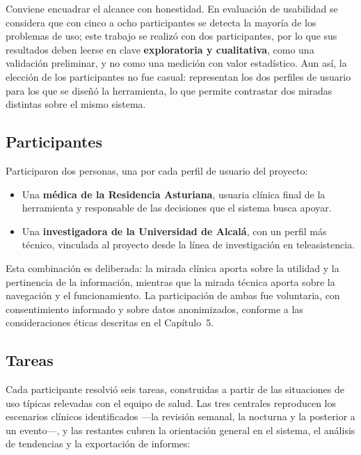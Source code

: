 \documentclass[12pt,a4paper]{article}
\begin{document}
    Conviene encuadrar el alcance con honestidad. En evaluación de usabilidad se considera que con cinco a ocho participantes se detecta la mayoría de los problemas de uso; este trabajo se realizó con dos participantes, por lo que sus resultados deben leerse en clave \textbf{exploratoria y cualitativa}, como una validación preliminar, y no como una medición con valor estadístico. Aun así, la elección de los participantes no fue casual: representan los dos perfiles de usuario para los que se diseñó la herramienta, lo que permite contrastar dos miradas distintas sobre el mismo sistema.

    \subsection{Participantes}
    Participaron dos personas, una por cada perfil de usuario del proyecto:

    \begin{itemize}
        \item Una \textbf{médica de la Residencia Asturiana}, usuaria clínica final de la herramienta y responsable de las decisiones que el sistema busca apoyar.
        \item Una \textbf{investigadora de la Universidad de Alcalá}, con un perfil más técnico, vinculada al proyecto desde la línea de investigación en teleasistencia.
    \end{itemize}

    Esta combinación es deliberada: la mirada clínica aporta sobre la utilidad y la pertinencia de la información, mientras que la mirada técnica aporta sobre la navegación y el funcionamiento. La participación de ambas fue voluntaria, con consentimiento informado y sobre datos anonimizados, conforme a las consideraciones éticas descritas en el Capítulo~5.

    \subsection{Tareas}
    Cada participante resolvió seis tareas, construidas a partir de las situaciones de uso típicas relevadas con el equipo de salud. Las tres centrales reproducen los escenarios clínicos identificados —la revisión semanal, la nocturna y la posterior a un evento—, y las restantes cubren la orientación general en el sistema, el análisis de tendencias y la exportación de informes:
\end{document}
